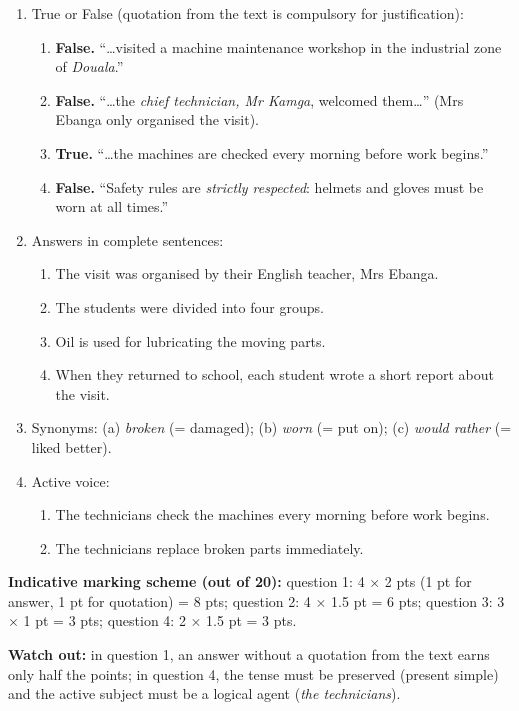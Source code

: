 \documentclass[11pt]{article}
\begin{document}
\begin{corrige}
\begin{enumerate}
\item True or False (quotation from the text is compulsory for justification):
\begin{enumerate}
\item \textbf{False.} ``\ldots visited a machine maintenance workshop in the industrial zone of \emph{Douala}.''
\item \textbf{False.} ``\ldots the \emph{chief technician, Mr Kamga}, welcomed them\ldots'' (Mrs Ebanga only organised the visit).
\item \textbf{True.} ``\ldots the machines are checked every morning before work begins.''
\item \textbf{False.} ``Safety rules are \emph{strictly respected}: helmets and gloves must be worn at all times.''
\end{enumerate}
\item Answers in complete sentences:
\begin{enumerate}
\item The visit was organised by their English teacher, Mrs Ebanga.
\item The students were divided into four groups.
\item Oil is used for lubricating the moving parts.
\item When they returned to school, each student wrote a short report about the visit.
\end{enumerate}
\item Synonyms: (a) \emph{broken} (= damaged); (b) \emph{worn} (= put on); (c) \emph{would rather} (= liked better).
\item Active voice:
\begin{enumerate}
\item The technicians check the machines every morning before work begins.
\item The technicians replace broken parts immediately.
\end{enumerate}
\end{enumerate}
\textbf{Indicative marking scheme (out of 20):} question 1: 4 $\times$ 2 pts (1 pt for answer, 1 pt for quotation) = 8 pts; question 2: 4 $\times$ 1.5 pt = 6 pts; question 3: 3 $\times$ 1 pt = 3 pts; question 4: 2 $\times$ 1.5 pt = 3 pts.

\textbf{Watch out:} in question 1, an answer without a quotation from the text earns only half the points; in question 4, the tense must be preserved (present simple) and the active subject must be a logical agent (\emph{the technicians}).
\end{corrige}
\end{document}

